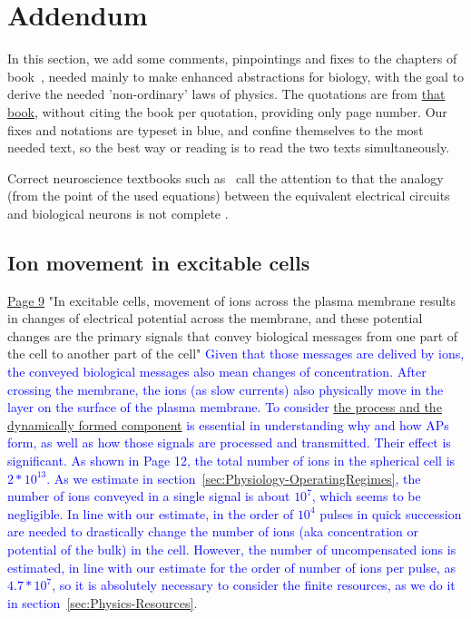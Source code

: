 
\section{Addendum\label{sec:Physics-Addendum}}

In this section, we add some comments, pinpointings and fixes to the chapters of book~\cite{JohnstonWuNeurophysiology:1995}, needed mainly to make 
enhanced abstractions for biology, with the goal to derive the needed 'non-ordinary' laws of physics.
The quotations are from \href{https://rcweb.dartmouth.edu/~mvdm/wiki/lib/exe/fetch.php?media=analysis:johnstonwu.pdf}{that book},
without citing the book per quotation, providing only page number. Our fixes and notations are
typeset in blue, and confine themselves to the most needed text,
so the best way or reading is to read the two texts simultaneously.

Correct neuroscience textbooks such as~\cite{MillerComputationalNeuroscience:2018} call the attention to that the analogy (from the point of the used equations) between the equivalent 
electrical circuits and biological neurons is not complete
.

\subsection{Ion movement in excitable cells\label{sec:Physics-IonMovement}}
\href{https://rcweb.dartmouth.edu/~mvdm/wiki/lib/exe/fetch.php?media=analysis:johnstonwu.pdf}{Page 9} "In excitable cells, movement of
ions across the plasma membrane results in changes of electrical potential
across the membrane, and these potential changes are the primary signals
that convey biological messages from one part of the cell to another part
of the cell" \textcolor{blue}{Given that those messages are delived by ions, the conveyed biological messages also mean changes of concentration. After crossing the membrane,
the ions (as slow currents) also physically move in the layer on the surface of 
the plasma membrane. To consider \hyperlink{atomic_layer}
{the process and the dynamically formed component} is essential in understanding why and how
APs form, as well as how those signals are processed and transmitted. Their effect is significant. As shown in Page 12, the total number of ions in the spherical cell is $2*10^{13}$. As we estimate in section~\ref{sec:Physiology-OperatingRegimes}, the number of ions conveyed in a single signal is about $10^{7}$, which seems to be negligible. In line with our estimate, in the order of $10^4$ pulses in quick succession are needed to drastically change the number of ions (aka concentration or potential of the bulk) in the cell. However, the 
number of uncompensated ions is estimated, in line with our estimate for the order of number of ions per pulse,  as $4.7*10^7$, so it is absolutely necessary to consider
the finite resources, as we do it in section~\ref{sec:Physics-Resources}.}

